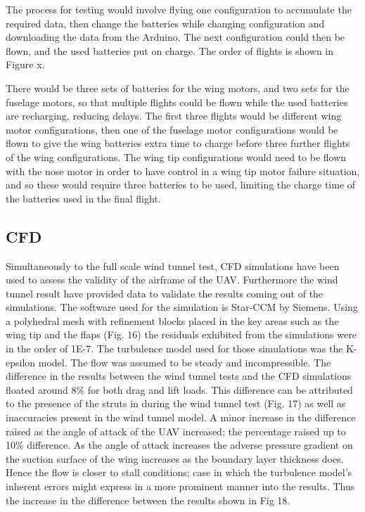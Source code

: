 \documentclass[../../main.tex]{subfiles}
\begin{document}
The process for testing would involve flying one configuration to accumulate the required data, then change the batteries while changing configuration and downloading the data from the Arduino.
The next configuration could then be flown, and the used batteries put on charge.
The order of flights is shown in Figure x. 


There would be three sets of batteries for the wing motors, and two sets for the fuselage motors, so that multiple flights could be flown while the used batteries are recharging, reducing delays.
The first three flights would be different wing motor configurations, then one of the fuselage motor configurations would be flown to give the wing batteries extra time to charge before three further flights of the wing configurations.
The wing tip configurations would need to be flown with the nose motor in order to have control in a wing tip motor failure situation, and so these would require three batteries to be used, limiting the charge time of the batteries used in the final flight.


\subsection{CFD} \label{sec:project-review:testing-and-evaluation:cfd}

Simultaneously to the full scale wind tunnel test, CFD simulations have been used to assess the validity of the airframe of the UAV.
Furthermore the wind tunnel result have provided data to validate the results coming out of the simulations.
The software used for the simulation is Star-CCM by Siemens.
Using a polyhedral mesh with refinement blocks placed in the key areas such as the wing tip and the flaps (Fig. 16) the residuals exhibited from the simulations were in the order of 1E-7.
The turbulence model used for those simulations was the K-epsilon model.
The flow was assumed to be steady and incompressible.
The difference in the results between the wind tunnel tests and the CFD simulations floated around 8\% for both drag and lift loads.
This difference can be attributed to the presence of the struts in during the wind tunnel test (Fig. 17) as well as inaccuracies present in the wind tunnel model.
A minor increase in the difference raised as the angle of attack of the UAV increased; the percentage raised up to 10\% difference.
As the angle of attack increases the adverse pressure gradient on the suction surface of the wing increases as the boundary layer thickness does.
Hence the flow is closer to stall conditions; case in which the turbulence model’s inherent errors might express in a more prominent manner into the results.
Thus the increase in the difference between the results shown in Fig 18. 
\end{document}
